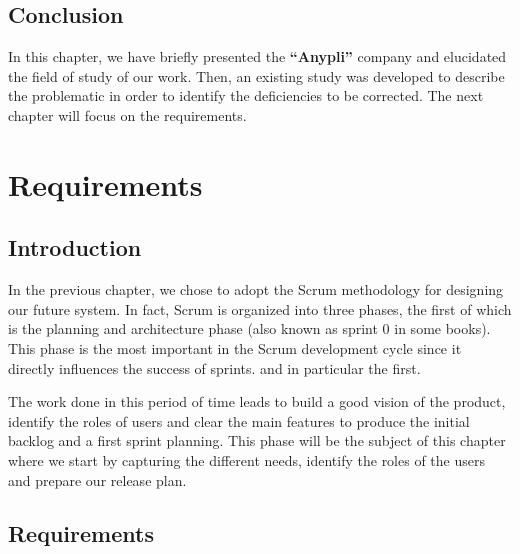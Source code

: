 \documentclass[12pt,a4paper]{report}
\begin{document}
	\section*{Conclusion}
	In this chapter, we have briefly presented the \textbf{``Anypli''} company and elucidated the field of study of our work. Then, an existing study was developed to describe the problematic in order to identify the deficiencies to be corrected.
	The next chapter will focus on the requirements.
	\chapter{Requirements}
	\section*{Introduction}
	In the previous chapter, we chose to adopt the Scrum methodology for designing our future system. In fact, Scrum is organized into three phases, the first of which is the planning and architecture phase (also known as sprint 0 in some books). This phase is the most important in the Scrum development cycle since it directly influences the success of sprints. and in particular the first.\par 
	The work done in this period of time leads to build a good vision of the product, identify the roles of users and clear the main features to produce the initial backlog and a first sprint planning. This phase will be the subject of this chapter where we start by capturing the different needs, identify the roles of the users and prepare our release plan.
	
	\section{Requirements}
\end{document}
